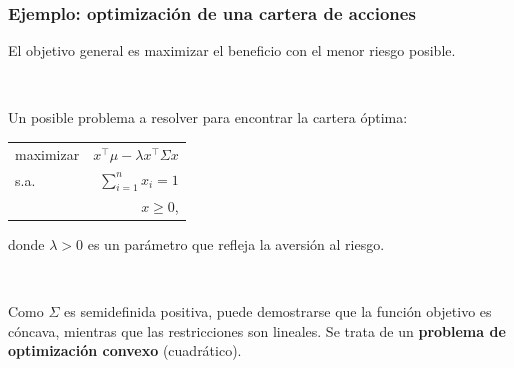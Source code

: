 \documentclass{beamer}
\begin{document}
\begin{frame}
\frametitle{Ejemplo: optimización de una cartera de acciones}

El objetivo general es maximizar el beneficio con el menor riesgo posible.

\

Un posible problema a resolver para encontrar la cartera óptima:
\begin{center}
\begin{tabular}{lr}
maximizar & $x^\top\mu - \lambda x^\top\Sigma x$ \\
s.a. & $\sum_{i=1}^n x_i=1$    \\
	& $x\geq 0$,
\end{tabular}
\end{center}
donde $\lambda>0$ es un parámetro que refleja la aversión al riesgo.

\

Como $\Sigma$ es semidefinida positiva, puede demostrarse que la función objetivo es cóncava, mientras que las restricciones son lineales. Se trata de un \textbf{problema de optimización convexo} (cuadrático).


\end{frame}
\end{document}
